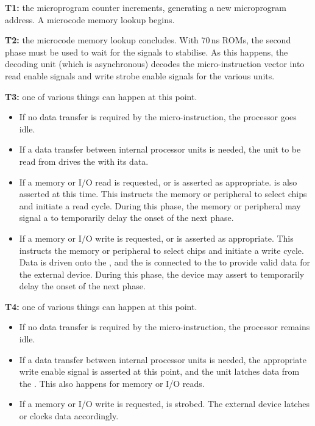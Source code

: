\begin{description}
\item{\bfseries T1:} the microprogram counter increments, generating a
  new microprogram address. A microcode memory lookup begins.
\item{\bfseries T2:} the microcode memory lookup concludes. With 70\,ns
  ROMs, the second phase must be used to wait for the signals to
  stabilise. As this happens, the decoding unit (which is
  asynchronous) decodes the micro-instruction vector into read enable
  signals and write strobe enable signals for the various units.
\item{\bfseries T3:} one of various things can happen at this point.
  \begin{itemize}
    \item If no data transfer is required by the micro-instruction, the
      processor goes idle.
    \item If a data transfer between internal processor units is
      needed, the unit to be read from drives the \IBUS{} with its data.
    \item If a memory or I/O read is requested,  or  is
      asserted as appropriate.  is also asserted at this
      time. This instructs the memory or peripheral to select chips
      and initiate a read cycle. During this phase, the memory or
      peripheral may signal a  to temporarily delay the onset
      of the next phase.
    \item If a memory or I/O write is requested,  or 
      is asserted as appropriate. This instructs the memory or
      peripheral to select chips and initiate a write cycle. Data is
      driven onto the \IBUS{}, and the \DBUS{} is connected to the
      \IBUS{} to provide valid data for the external device. During
      this phase, the device may assert  to temporarily delay
      the onset of the next phase.
  \end{itemize}
\item{\bfseries T4:} one of various things can happen at this point.
  \begin{itemize}
  \item If no data transfer is required by the micro-instruction, the
    processor remains idle.
  \item If a data transfer between internal processor units is
    needed, the appropriate write enable signal is asserted at this
    point, and the unit latches data from the \IBUS. This also
    happens for memory or I/O reads.
  \item If a memory or I/O write is requested,  is
      strobed. The external device latches or clocks data
      accordingly.
  \end{itemize}
\end{description}

